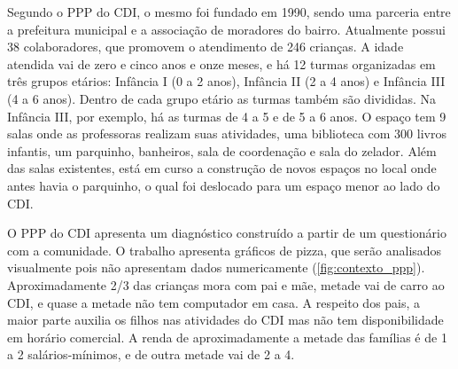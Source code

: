 Segundo o \ac{PPP} do \ac{CDI}, o mesmo foi fundado em 1990, sendo uma parceria entre a prefeitura municipal e a associação de moradores do bairro. Atualmente possui 38 colaboradores, que promovem o atendimento de 246 crianças. A idade atendida vai de zero e cinco anos e onze meses, e há 12 turmas organizadas em três grupos etários: Infância I (0 a 2 anos), Infância II (2 a 4 anos) e Infância III (4 a 6 anos). Dentro de cada grupo etário as turmas também são divididas. Na Infância III, por exemplo, há as turmas de 4 a 5 e de 5 a 6 anos. O espaço tem 9 salas onde as professoras realizam suas atividades, uma biblioteca com 300 livros infantis, um parquinho, banheiros, sala de coordenação e sala do zelador. Além das salas existentes, está em curso a construção de novos espaços no local onde antes havia o parquinho, o qual foi deslocado para um espaço menor ao lado do CDI. 

O \ac{PPP} do \ac{CDI} apresenta um diagnóstico construído a partir de um questionário com a comunidade. O trabalho apresenta gráficos de pizza, que serão analisados visualmente pois não apresentam dados numericamente (\autoref{fig:contexto_ppp}). Aproximadamente 2/3 das crianças mora com pai e mãe, metade vai de carro ao \ac{CDI}, e quase a metade não tem computador em casa. A respeito dos pais, a maior parte auxilia os filhos nas atividades do \ac{CDI} mas não tem disponibilidade em horário comercial. A renda de aproximadamente a metade das famílias é de 1 a 2 salários-mínimos, e de outra metade vai de 2 a 4.

